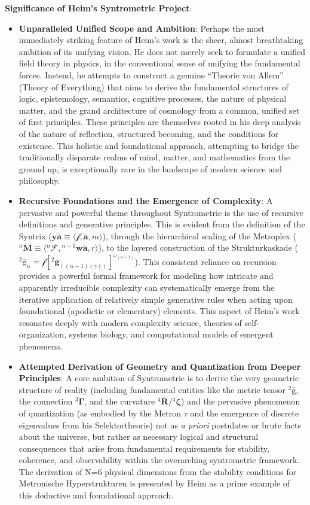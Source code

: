 \documentclass[12pt]{article}
\newcommand{\syntrix}{\bm{y\widetilde{a}}}
\newcommand{\metrophor}{\bm{\widetilde{a}}}
\newcommand{\synkolator}{\mathcal{f}}
\newcommand{\synkolationsstufe}{m}
\newcommand{\metroplex}[1]{{}^{#1}\mathbf{M}}
\newcommand{\hypermetrophor}[1]{{}^{#1}\mathbf{w\widetilde{a}}}
\newcommand{\metroplexsynkolator}[1]{{}^{#1}\mathcal{F}}
\newcommand{\kompositionsfeld}{{}^2\bar{\mathrm{g}}}
\newcommand{\partialstruktur}[1]{{}^2\mathbf{g}_{(#1)}}
\newcommand{\fundamentalkondensor}{{}^3\bm{\Gamma}}
\newcommand{\metron}{\tau}
\newcommand{\strukturkompressor}{{}^4\bm{\zeta}}
\begin{document}
\textbf{Significance of Heim's Syntrometric Project}:
\begin{itemize}
    \item \textbf{Unparalleled Unified Scope and Ambition}: Perhaps the most immediately striking feature of Heim's work is the sheer, almost breathtaking ambition of its unifying vision. He does not merely seek to formulate a unified field theory in physics, in the conventional sense of unifying the fundamental forces. Instead, he attempts to construct a genuine \enquote{Theorie von Allem} (Theory of Everything) that aims to derive the fundamental structures of logic, epistemology, semantics, cognitive processes, the nature of physical matter, and the grand architecture of cosmology from a common, unified set of first principles. These principles are themselves rooted in his deep analysis of the nature of reflection, structured becoming, and the conditions for existence. This holistic and foundational approach, attempting to bridge the traditionally disparate realms of mind, matter, and mathematics from the ground up, is exceptionally rare in the landscape of modern science and philosophy.
    \item \textbf{Recursive Foundations and the Emergence of Complexity}: A pervasive and powerful theme throughout Syntrometrie is the use of recursive definitions and generative principles. This is evident from the definition of the Syntrix (\( \syntrix \equiv \langle \synkolator, \metrophor, \synkolationsstufe \rangle \)), through the hierarchical scaling of the Metroplex (\( \metroplex{n} \equiv \langle \metroplexsynkolator{n}, \hypermetrophor{n-1}, r \rangle \)), to the layered construction of the Strukturkaskade (\( \kompositionsfeld_\alpha = \mathcal{f}[\partialstruktur{(\alpha-1)(\gamma)}]^{\omega_{(\alpha-1)}} \)). This consistent reliance on recursion provides a powerful formal framework for modeling how intricate and apparently irreducible complexity can systematically emerge from the iterative application of relatively simple generative rules when acting upon foundational (apodictic or elementary) elements. This aspect of Heim's work resonates deeply with modern complexity science, theories of self-organization, systems biology, and computational models of emergent phenomena.
    \item \textbf{Attempted Derivation of Geometry and Quantization from Deeper Principles}: A core ambition of Syntrometrie is to derive the very geometric structure of reality (including fundamental entities like the metric tensor \( \kompositionsfeld \), the connection \( \fundamentalkondensor \), and the curvature \( {}^4\mathbf{R}/\strukturkompressor \)) and the pervasive phenomenon of quantization (as embodied by the Metron \( \metron \) and the emergence of discrete eigenvalues from his Selektortheorie) not as \textit{a priori} postulates or brute facts about the universe, but rather as necessary logical and structural consequences that arise from fundamental requirements for stability, coherence, and observability within the overarching syntrometric framework. The derivation of N=6 physical dimensions from the stability conditions for Metronische Hyperstrukturen is presented by Heim as a prime example of this deductive and foundational approach.

\end{itemize}
\end{document}
